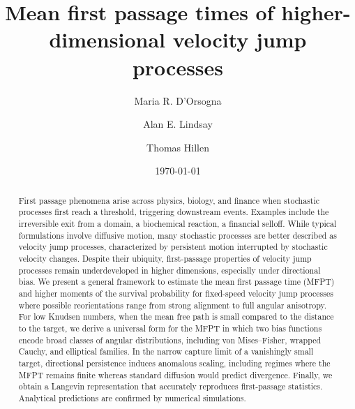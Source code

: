 \documentclass[
 reprint,










 amsmath,amssymb,
 aps, prl,






longbibliography
]{revtex4-2}
\begin{document}


\title{Mean first passage times of higher-dimensional velocity jump processes}



\author{Maria R. D'Orsogna}


\author{Alan E. Lindsay}


\author{Thomas Hillen}



\date{\today}


\begin{abstract}
First passage phenomena arise across physics, biology, and finance when stochastic processes first reach a threshold, triggering downstream events. Examples include the irreversible exit from a domain, a biochemical reaction, a financial selloff. While typical formulations involve diffusive motion, many stochastic processes are better described as velocity jump processes, characterized by persistent motion interrupted by stochastic velocity changes. Despite their ubiquity, first-passage properties of velocity jump processes remain underdeveloped in higher dimensions, especially under directional bias. We present a general framework to estimate the mean first passage time (MFPT) and higher moments of the survival probability for fixed-speed velocity jump processes where possible reorientations range from strong alignment to full angular anisotropy. For low Knudsen numbers, when the mean free path is small compared to the distance to the target, we derive a universal form for the MFPT in which two bias functions encode broad classes of angular distributions, including von Mises–Fisher, wrapped Cauchy, and elliptical families. In the narrow capture limit of a vanishingly small target, directional persistence induces anomalous scaling, including regimes where the MFPT remains finite whereas standard diffusion would predict divergence. Finally, we obtain a Langevin representation that accurately reproduces first-passage statistics. Analytical predictions are confirmed
by numerical simulations.
\end{abstract}
\end{document}
